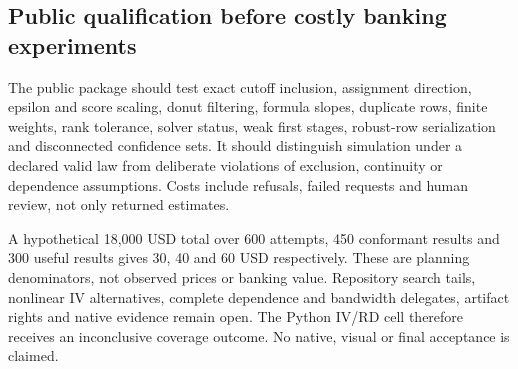 \subsection{Public qualification before costly banking experiments}
The public package should test exact cutoff inclusion, assignment direction,
epsilon and score scaling, donut filtering, formula slopes, duplicate rows,
finite weights, rank tolerance, solver status, weak first stages, robust-row
serialization and disconnected confidence sets. It should distinguish
simulation under a declared valid law from deliberate violations of
exclusion, continuity or dependence assumptions. Costs include refusals,
failed requests and human review, not only returned estimates.
\citep{exec25_pyrdiv_choice}

A hypothetical 18,000 USD total over 600 attempts, 450 conformant results
and 300 useful results gives 30, 40 and 60 USD respectively. These are
planning denominators, not observed prices or banking value. Repository
search tails, nonlinear IV alternatives, complete dependence and
bandwidth delegates, artifact rights and native evidence remain open.
The Python IV/RD cell therefore receives an inconclusive coverage outcome.
No native, visual or final acceptance is claimed.
\citep{exec25_pyrdiv_choice}
